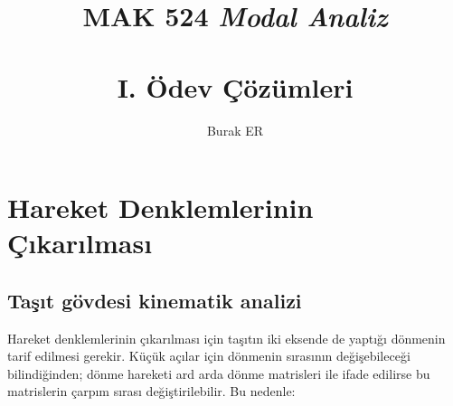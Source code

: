 \documentclass[a4paper]{report}
\title{MAK 524 \emph{Modal Analiz}\\~\\ I. Ödev Çözümleri}
\author{Burak ER}
\begin{document}
\maketitle


\section*{Hareket Denklemlerinin Çıkarılması}

\subsection*{Taşıt gövdesi kinematik analizi}

Hareket denklemlerinin çıkarılması için taşıtın iki eksende de yaptığı dönmenin tarif edilmesi gerekir. Küçük açılar için dönmenin sırasının değişebileceği bilindiğinden; dönme hareketi ard arda dönme matrisleri ile ifade edilirse bu matrislerin çarpım sırası değiştirilebilir. Bu nedenle:
\end{document}
